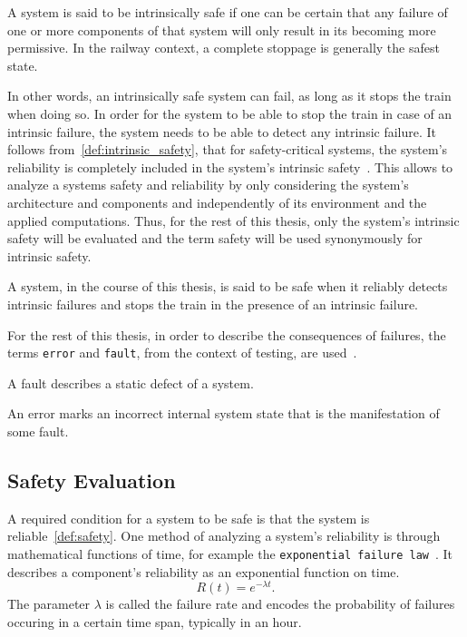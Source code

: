 \begin{definition}
A system is said to be intrinsically safe if one can be certain that any failure of one or more components of that system will only result in its becoming more permissive.
In the railway context, a complete stoppage is generally the safest state.
\label{def:intrinsic_safety}
\end{definition}

In other words, an intrinsically safe system can fail, as long as it stops the train when doing so.
In order for the system to be able to stop the train in case of an intrinsic failure, the system needs to be able to detect any intrinsic failure.
It follows from~\autoref{def:intrinsic_safety}, that for safety-critical systems, the system's reliability is completely included in the system's intrinsic safety~\cite{BoulangerStandards}.
This allows to analyze a systems safety and reliability by only considering the system's architecture and components and independently of its environment and the applied computations.
Thus, for the rest of this thesis, only the system's intrinsic safety will be evaluated and the term safety will be used synonymously for intrinsic safety.
\begin{definition}
A system, in the course of this thesis, is said to be safe when it reliably detects intrinsic failures and stops the train in the presence of an intrinsic failure.
\label{def:safety}
\end{definition}

For the rest of this thesis, in order to describe the consequences of failures, the terms \texttt{error} and \texttt{fault}, from the context of testing, are used~\cite{AmmannOffutt2016}.

\begin{definition}
A fault describes a static defect of a system.
\end{definition}

\begin{definition}
An error marks an incorrect internal system state that is the manifestation of some fault.
\end{definition}

\subsection{Safety Evaluation}
A required condition for a system to be safe is that the system is reliable~\autoref{def:safety}.
One method of analyzing a system's reliability is through mathematical functions of time, for example the \texttt{exponential failure law}~\cite{GeffroyMotetDependableComputing}.
It describes a component's reliability as an exponential function on time.
\begin{equation}
R(t) = e^{-\lambda t}.
\label{eq:expFailureLaw}
\end{equation}
The parameter $\lambda$ is called the failure rate and encodes the probability of failures occuring in a certain time span, typically in an hour.
\\

